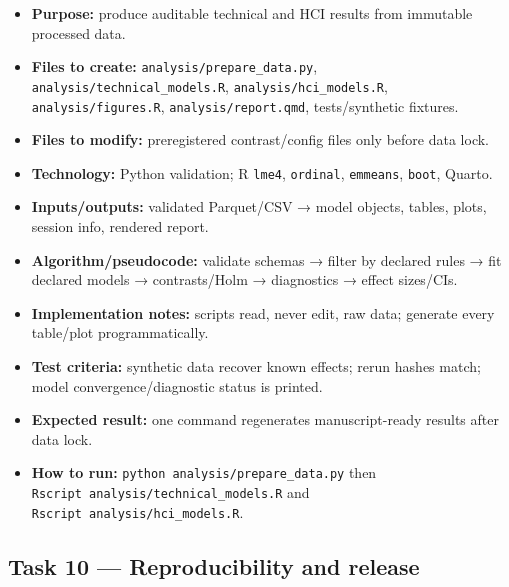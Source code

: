 \documentclass[
  english,
  11pt,
  a4paper,
]{article}
\providecommand{\tightlist}{%
  \setlength{\itemsep}{0pt}\setlength{\parskip}{0pt}}
\begin{document}
\begin{itemize}
\tightlist
\item
  \textbf{Purpose:} produce auditable technical and HCI results from
  immutable processed data.
\item
  \textbf{Files to create:} \texttt{analysis/prepare\_data.py},
  \texttt{analysis/technical\_models.R},
  \texttt{analysis/hci\_models.R}, \texttt{analysis/figures.R},
  \texttt{analysis/report.qmd}, tests/synthetic fixtures.
\item
  \textbf{Files to modify:} preregistered contrast/config files only
  before data lock.
\item
  \textbf{Technology:} Python validation; R \texttt{lme4},
  \texttt{ordinal}, \texttt{emmeans}, \texttt{boot}, Quarto.
\item
  \textbf{Inputs/outputs:} validated Parquet/CSV → model objects,
  tables, plots, session info, rendered report.
\item
  \textbf{Algorithm/pseudocode:} validate schemas → filter by declared
  rules → fit declared models → contrasts/Holm → diagnostics → effect
  sizes/CIs.
\item
  \textbf{Implementation notes:} scripts read, never edit, raw data;
  generate every table/plot programmatically.
\item
  \textbf{Test criteria:} synthetic data recover known effects; rerun
  hashes match; model convergence/diagnostic status is printed.
\item
  \textbf{Expected result:} one command regenerates manuscript-ready
  results after data lock.
\item
  \textbf{How to run:} \texttt{python\ analysis/prepare\_data.py} then
  \texttt{Rscript\ analysis/technical\_models.R} and
  \texttt{Rscript\ analysis/hci\_models.R}.
\end{itemize}

\subsection{Task 10 --- Reproducibility and
release}\label{task-10-reproducibility-and-release}
\end{document}
